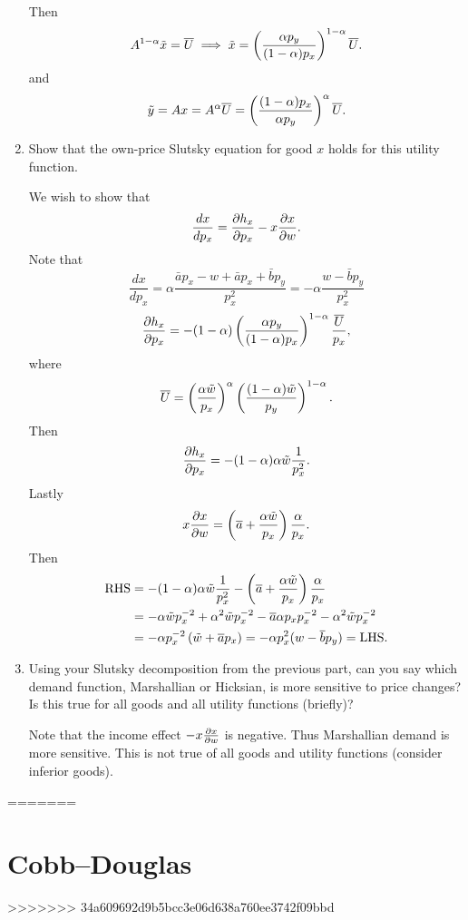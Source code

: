 \documentclass[11pt]{article}
\begin{document}
\begin{enumerate}
\begin{sol}
        Then \[
        A^{1-\alpha} \tilde x = \overline U \implies \tilde x = \left({\frac{\alpha p_y}{(1- \alpha) p_x}}\right)^{1-\alpha} \overline U.
        \]
        and \[
        \tilde y = A x = A^{\alpha} \overline U = \left({\frac{(1- \alpha)p_x}{\alpha p_y}}\right)^\alpha \overline U.
        \]    
    \end{sol}
    \item Show that the own-price Slutsky equation for good $x$ holds for this utility function.
    \begin{sol}
        We wish to show that \[
        \frac{dx}{dp_x} = \frac{\partial{h_x}}{\partial{p_x}} - x \frac{\partial{x}}{\partial{w}}.
        \]
        Note that \[\frac{dx}{dp_x} = \alpha \frac{\bar a p_x - w + \bar a p_x + \bar b p_y}{p_x^2} = -\alpha \frac{w - \bar b p_y}{p_x^2} \]
        \[
        \frac{\partial{h_x}}{\partial{p_x}} = - (1-\alpha) \left({\frac{\alpha p_y}{(1- \alpha) p_x}}\right)^{1-\alpha} \frac{\overline U}{p_x},
        \]
        where \[\overline U = \left({\frac{\alpha \tilde w}{p_x}}\right)^\alpha \left({\frac{(1-\alpha) \tilde w}{p_y}}\right)^{1-\alpha}.\]
        Then \[
        \frac{\partial{h_x}}{\partial{p_x}}
= -(1-\alpha) \alpha \tilde w \frac{1}{p_x^2}.
        \]
        Lastly \[
        x\frac{\partial{x}}{\partial{w}} = \left({\overline a + \frac{\alpha \tilde w}{p_x}}\right)\frac{\alpha}{p_x}.
        \]
        Then \begin{align*}
        \text{RHS} &= -(1-\alpha) \alpha \tilde w \frac{1}{p_x^2} - \left({\overline a + \frac{\alpha \tilde w}{p_x}}\right)\frac{\alpha}{p_x} \\
        &= -\alpha \tilde w p_x^{-2} + \alpha^2 \tilde w p_x^{-2} - \overline a \alpha p_x p_x^{-2} - \alpha^2 \tilde w p_x^{-2} \\
        &= -\alpha p_x^{-2} \left({\tilde w + \overline a p_x}\right) = -\alpha p_x^2 (w - \overline b p_y) = \text{LHS}.
        \end{align*}
        \end{sol}
        \item Using your Slutsky decomposition from the previous part, can you say which demand function, Marshallian or Hicksian, is more sensitive to price changes? Is this true for all goods and all utility functions (briefly)?
        \begin{sol}
            Note that the income effect $-x\frac{\partial{x}}{\partial{w}}$ is negative. Thus Marshallian demand is more sensitive. This is not true of all goods and utility functions (consider inferior goods). 
        \end{sol}

\end{enumerate}
=======

\section{Cobb--Douglas}
>>>>>>> 34a609692d9b5bcc3e06d638a760ee3742f09bbd
\end{document}
